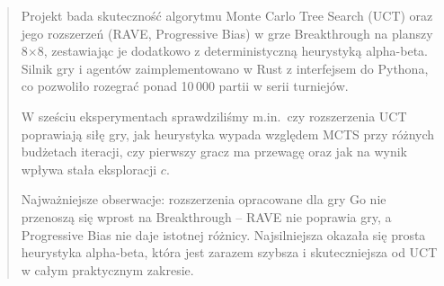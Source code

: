 \begin{abstract}
\noindent
Projekt bada skuteczność algorytmu Monte Carlo Tree Search (UCT) oraz jego
rozszerzeń (RAVE, Progressive Bias) w grze Breakthrough na planszy 8$\times$8,
zestawiając je dodatkowo z deterministyczną heurystyką alpha-beta. Silnik gry
i agentów zaimplementowano w Rust z interfejsem do Pythona, co pozwoliło
rozegrać ponad 10\,000 partii w serii turniejów.

W sześciu eksperymentach sprawdziliśmy m.in.\ czy rozszerzenia UCT poprawiają siłę
gry, jak heurystyka wypada względem MCTS przy różnych budżetach iteracji, czy
pierwszy gracz ma przewagę oraz jak na wynik wpływa stała eksploracji $c$.

Najważniejsze obserwacje: rozszerzenia opracowane dla gry Go nie przenoszą się
wprost na Breakthrough -- RAVE nie poprawia gry, a Progressive Bias nie daje
istotnej różnicy. Najsilniejsza okazała się prosta heurystyka alpha-beta, która
jest zarazem szybsza i skuteczniejsza od UCT w całym praktycznym zakresie.
\end{abstract}

